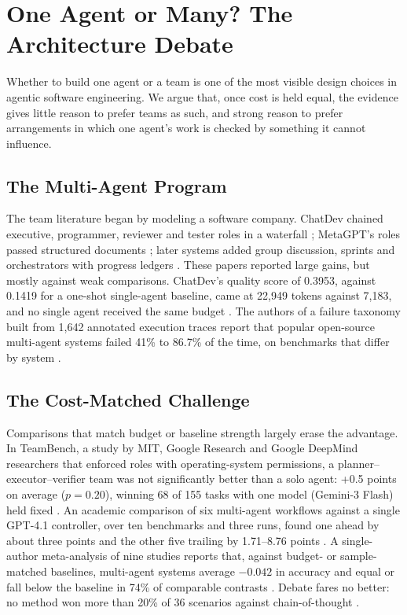 \section{One Agent or Many? The Architecture Debate}\label{sec:architecture}

Whether to build one agent or a team is one of the most visible design choices in agentic software engineering. We argue that, once cost is held equal, the evidence gives little reason to prefer teams as such, and strong reason to prefer arrangements in which one agent's work is checked by something it cannot influence.

\subsection{The Multi-Agent Program}

The team literature began by modeling a software company. ChatDev chained executive, programmer, reviewer and tester roles in a waterfall \citep{T1}; MetaGPT's roles passed structured documents \citep{T2}; later systems added group discussion, sprints and orchestrators with progress ledgers \citep{T3,T5,A11}. These papers reported large gains, but mostly against weak comparisons. ChatDev's quality score of 0.3953, against 0.1419 for a one-shot single-agent baseline, came at 22,949 tokens against 7,183, and no single agent received the same budget \citep{T1}. The authors of a failure taxonomy built from 1,642 annotated execution traces report that popular open-source multi-agent systems failed 41\% to 86.7\% of the time, on benchmarks that differ by system \citep{T7}.

\subsection{The Cost-Matched Challenge}

Comparisons that match budget or baseline strength largely erase the advantage. In TeamBench, a study by MIT, Google Research and Google DeepMind researchers that enforced roles with operating-system permissions, a planner--executor--verifier team was not significantly better than a solo agent: +0.5 points on average ($p = 0.20$), winning 68 of 155 tasks with one model (Gemini-3 Flash) held fixed \citep{T18}. An academic comparison of six multi-agent workflows against a single GPT-4.1 controller, over ten benchmarks and three runs, found one ahead by about three points and the other five trailing by 1.71--8.76 points \citep{T25}. A single-author meta-analysis of nine studies reports that, against budget- or sample-matched baselines, multi-agent systems average $-0.042$ in accuracy and equal or fall below the baseline in 74\% of comparable contrasts \citep{T9}. Debate fares no better: no method won more than 20\% of 36 scenarios against chain-of-thought \citep{T10}.


